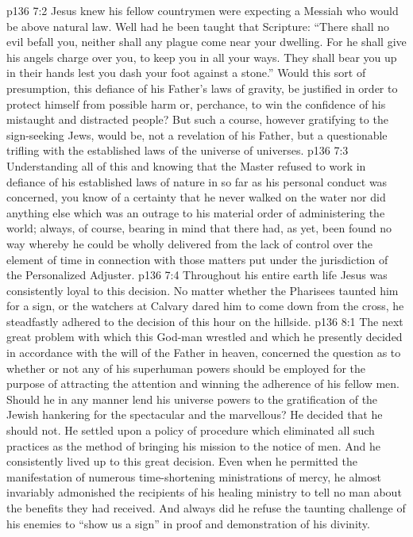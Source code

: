 \vs p136 7:2 Jesus knew his fellow countrymen were expecting a Messiah who would be above natural law. Well had he been taught that Scripture: “There shall no evil befall you, neither shall any plague come near your dwelling. For he shall give his angels charge over you, to keep you in all your ways. They shall bear you up in their hands lest you dash your foot against a stone.” Would this sort of presumption, this defiance of his Father’s laws of gravity, be justified in order to protect himself from possible harm or, perchance, to win the confidence of his mistaught and distracted people? But such a course, however gratifying to the sign\hyp{}seeking Jews, would be, not a revelation of his Father, but a questionable trifling with the established laws of the universe of universes.
\vs p136 7:3 \pc Understanding all of this and knowing that the Master refused to work in defiance of his established laws of nature in so far as his personal conduct was concerned, you know of a certainty that he never walked on the water nor did anything else which was an outrage to his material order of administering the world; always, of course, bearing in mind that there had, as yet, been found no way whereby he could be wholly delivered from the lack of control over the element of time in connection with those matters put under the jurisdiction of the Personalized Adjuster.
\vs p136 7:4 Throughout his entire earth life Jesus was consistently loyal to this decision. No matter whether the Pharisees taunted him for a sign, or the watchers at Calvary dared him to come down from the cross, he steadfastly adhered to the decision of this hour on the hillside.
\vs p136 8:1 The next great problem with which this God\hyp{}man wrestled and which he presently decided in accordance with the will of the Father in heaven, concerned the question as to whether or not any of his superhuman powers should be employed for the purpose of attracting the attention and winning the adherence of his fellow men. Should he in any manner lend his universe powers to the gratification of the Jewish hankering for the spectacular and the marvellous? He decided that he should not. He settled upon a policy of procedure which eliminated all such practices as the method of bringing his mission to the notice of men. And he consistently lived up to this great decision. Even when he permitted the manifestation of numerous time\hyp{}shortening ministrations of mercy, he almost invariably admonished the recipients of his healing ministry to tell no man about the benefits they had received. And always did he refuse the taunting challenge of his enemies to “show us a sign” in proof and demonstration of his divinity.

